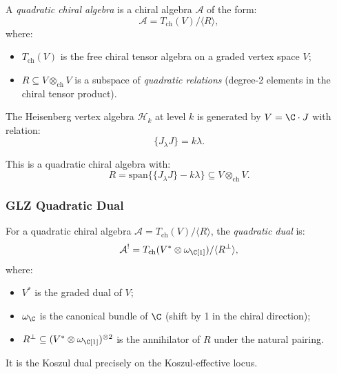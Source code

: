 \begin{definition}
\label{def:quadratic_chiral}
A \emph{quadratic chiral algebra} is a chiral algebra $\mathcal{A}$ of the form:
\begin{equation}
\mathcal{A} = T_{\text{ch}}(V) / \langle R \rangle,
\end{equation}
where:
\begin{itemize}
\item $T_{\text{ch}}(V)$ is the free chiral tensor algebra on a graded vertex space $V$;
\item $R \subseteq V \otimes_{\text{ch}} V$ is a subspace of \emph{quadratic relations} (degree-2 elements in the chiral tensor product).
\end{itemize}
\end{definition}

\begin{example}
\label{ex:Heisenberg_quadratic}
The Heisenberg vertex algebra $\mathcal{H}_k$ at level $k$ is generated by $V = \C \cdot J$ with relation:
\begin{equation}
\{J_\lambda J\} = k\lambda.
\end{equation}

This is a quadratic chiral algebra with:
\begin{equation}
R = \text{span}\big\{\{J_\lambda J\} - k\lambda\big\} \subseteq V \otimes_{\text{ch}} V.
\end{equation}
\end{example}

\subsubsection{GLZ Quadratic Dual}

\begin{definition}
\label{def:GLZ_Koszul}
For a quadratic chiral algebra
$\mathcal{A} = T_{\text{ch}}(V) / \langle R \rangle$, the
\emph{quadratic dual} is:
\begin{equation}
\mathcal{A}^! = T_{\text{ch}}(V^* \otimes \omega_\C[1]) / \langle R^\perp \rangle,
\end{equation}
where:
\begin{itemize}
\item $V^*$ is the graded dual of $V$;
\item $\omega_\C$ is the canonical bundle of $\C$ (shift by 1 in the chiral direction);
\item $R^\perp \subseteq (V^* \otimes \omega_\C[1])^{\otimes 2}$ is the annihilator of $R$ under the natural pairing.
\end{itemize}
It is the Koszul dual precisely on the Koszul-effective locus.
\end{definition}

